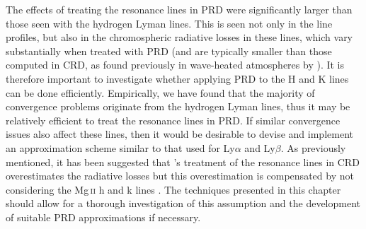 The effects of treating the \Caii{} resonance lines in PRD were significantly larger than those seen with the hydrogen Lyman lines.
This is seen not only in the line profiles, but also in the chromospheric radiative losses in these lines, which vary substantially when treated with PRD (and are typically smaller than those computed in CRD, as found previously in wave-heated atmospheres by \citet{Uitenbroek2002}).
It is therefore important to investigate whether applying PRD to the H and K lines can be done efficiently.
Empirically, we have found that the majority of convergence problems originate from the hydrogen Lyman lines, thus it may be relatively efficient to treat the \Caii{} resonance lines in PRD.
If similar convergence issues also affect these lines, then it would be desirable to devise and implement an approximation scheme similar to that used for Ly$\alpha$ and Ly$\beta$.
As previously mentioned, it has been suggested that \Radyn{}'s treatment of the \Caii{} resonance lines in CRD overestimates the radiative losses but this overestimation is compensated by not considering the Mg\,\textsc{ii} h and k lines \citep[e.g.][]{Carlsson2002,Kerr2019a}.
The techniques presented in this chapter should allow for a thorough investigation of this assumption and the development of suitable PRD approximations if necessary.

